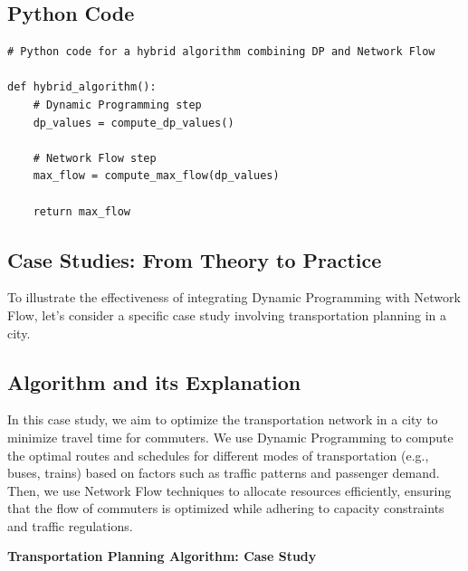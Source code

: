 \documentclass[12pt]{book} %
\begin{document}
\subsection{Python Code}

\FloatBarrier
\begin{lstlisting}
# Python code for a hybrid algorithm combining DP and Network Flow

def hybrid_algorithm():
    # Dynamic Programming step
    dp_values = compute_dp_values()
    
    # Network Flow step
    max_flow = compute_max_flow(dp_values)
    
    return max_flow
\end{lstlisting}
\FloatBarrier

\subsection{Case Studies: From Theory to Practice}

To illustrate the effectiveness of integrating Dynamic Programming with Network Flow, let's consider a specific case study involving transportation planning in a city.

\subsection{Algorithm and its Explanation}

In this case study, we aim to optimize the transportation network in a city to minimize travel time for commuters. We use Dynamic Programming to compute the optimal routes and schedules for different modes of transportation (e.g., buses, trains) based on factors such as traffic patterns and passenger demand. Then, we use Network Flow techniques to allocate resources efficiently, ensuring that the flow of commuters is optimized while adhering to capacity constraints and traffic regulations.

\textbf{Transportation Planning Algorithm: Case Study}
\end{document}

